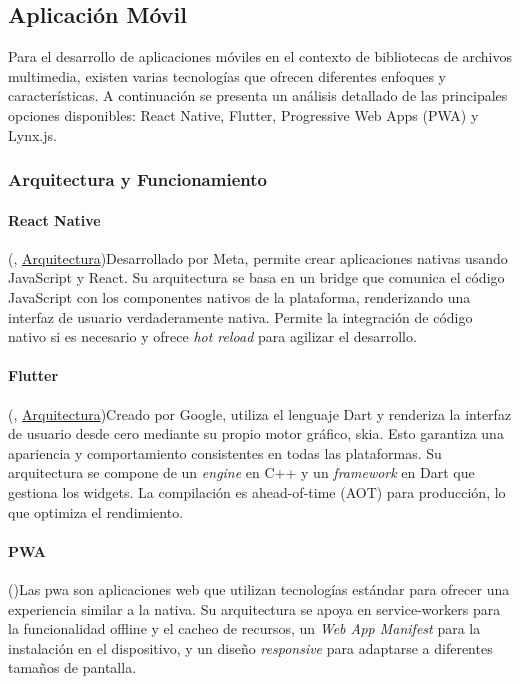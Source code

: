 \subsection{Aplicación Móvil}

Para el desarrollo de aplicaciones móviles en el contexto de bibliotecas de archivos multimedia, existen varias tecnologías que ofrecen diferentes enfoques y características. A continuación se presenta un análisis detallado de las principales opciones disponibles: React Native, Flutter, Progressive Web Apps (PWA) y Lynx.js.

\subsubsection{Arquitectura y Funcionamiento}

\paragraph{React Native}
(\cite{react-native-documentation}, \href{https://reactnative.dev/architecture/overview}{Arquitectura})Desarrollado por Meta, permite crear aplicaciones nativas usando JavaScript y React. Su arquitectura se basa en un \gls{bridge} que comunica el código JavaScript con los componentes nativos de la plataforma, renderizando una interfaz de usuario verdaderamente nativa. Permite la integración de código nativo si es necesario y ofrece \textit{hot reload} para agilizar el desarrollo.

\paragraph{Flutter}
(\cite{flutter-documentation}, \href{https://docs.flutter.dev/resources/architectural-overview}{Arquitectura})Creado por Google, utiliza el lenguaje Dart y renderiza la interfaz de usuario desde cero mediante su propio motor gráfico, \gls{skia}. Esto garantiza una apariencia y comportamiento consistentes en todas las plataformas. Su arquitectura se compone de un \textit{engine} en C++ y un \textit{framework} en Dart que gestiona los widgets. La compilación es \gls{ahead-of-time} (AOT) para producción, lo que optimiza el rendimiento.

\paragraph{PWA}
(\cite{pwa-documentation})Las \acrfull{pwa} son aplicaciones web que utilizan tecnologías estándar para ofrecer una experiencia similar a la nativa. Su arquitectura se apoya en \glspl{service-worker} para la funcionalidad offline y el cacheo de recursos, un \textit{Web App Manifest} para la instalación en el dispositivo, y un diseño \textit{responsive} para adaptarse a diferentes tamaños de pantalla.

